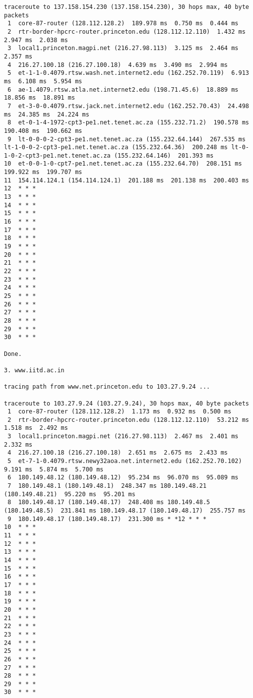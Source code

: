 \documentclass[a4paper]{article}
\begin{document}
\begin{enumerate}
\begin{lstlisting}
traceroute to 137.158.154.230 (137.158.154.230), 30 hops max, 40 byte packets
 1  core-87-router (128.112.128.2)  189.978 ms  0.750 ms  0.444 ms
 2  rtr-border-hpcrc-router.princeton.edu (128.112.12.110)  1.432 ms  2.947 ms  2.038 ms
 3  local1.princeton.magpi.net (216.27.98.113)  3.125 ms  2.464 ms  2.357 ms
 4  216.27.100.18 (216.27.100.18)  4.639 ms  3.490 ms  2.994 ms
 5  et-1-1-0.4079.rtsw.wash.net.internet2.edu (162.252.70.119)  6.913 ms  6.108 ms  5.954 ms
 6  ae-1.4079.rtsw.atla.net.internet2.edu (198.71.45.6)  18.889 ms  18.856 ms  18.891 ms
 7  et-3-0-0.4079.rtsw.jack.net.internet2.edu (162.252.70.43)  24.498 ms  24.385 ms  24.224 ms
 8  et-0-1-4-1972-cpt3-pe1.net.tenet.ac.za (155.232.71.2)  190.578 ms  190.408 ms  190.662 ms
 9  lt-0-0-0-2-cpt3-pe1.net.tenet.ac.za (155.232.64.144)  267.535 ms lt-1-0-0-2-cpt3-pe1.net.tenet.ac.za (155.232.64.36)  200.248 ms lt-0-1-0-2-cpt3-pe1.net.tenet.ac.za (155.232.64.146)  201.393 ms
10  et-0-0-1-0-cpt7-pe1.net.tenet.ac.za (155.232.64.70)  208.151 ms  199.922 ms  199.707 ms
11  154.114.124.1 (154.114.124.1)  201.188 ms  201.138 ms  200.403 ms
12  * * *
13  * * *
14  * * *
15  * * *
16  * * *
17  * * *
18  * * *
19  * * *
20  * * *
21  * * *
22  * * *
23  * * *
24  * * *
25  * * *
26  * * *
27  * * *
28  * * *
29  * * *
30  * * *

Done.

3. www.iitd.ac.in

tracing path from www.net.princeton.edu to 103.27.9.24 ...

traceroute to 103.27.9.24 (103.27.9.24), 30 hops max, 40 byte packets
 1  core-87-router (128.112.128.2)  1.173 ms  0.932 ms  0.500 ms
 2  rtr-border-hpcrc-router.princeton.edu (128.112.12.110)  53.212 ms  1.518 ms  2.492 ms
 3  local1.princeton.magpi.net (216.27.98.113)  2.467 ms  2.401 ms  2.332 ms
 4  216.27.100.18 (216.27.100.18)  2.651 ms  2.675 ms  2.433 ms
 5  et-7-1-0.4079.rtsw.newy32aoa.net.internet2.edu (162.252.70.102)  9.191 ms  5.874 ms  5.700 ms
 6  180.149.48.12 (180.149.48.12)  95.234 ms  96.070 ms  95.089 ms
 7  180.149.48.1 (180.149.48.1)  248.347 ms 180.149.48.21 (180.149.48.21)  95.220 ms  95.201 ms
 8  180.149.48.17 (180.149.48.17)  248.408 ms 180.149.48.5 (180.149.48.5)  231.841 ms 180.149.48.17 (180.149.48.17)  255.757 ms
 9  180.149.48.17 (180.149.48.17)  231.300 ms * *12 * * *
10  * * *
11  * * *
12  * * *
13  * * *
14  * * *
15  * * *
16  * * *
17  * * *
18  * * *
19  * * *
20  * * *
21  * * *
22  * * *
23  * * *
24  * * *
25  * * *
26  * * *
27  * * *
28  * * *
29  * * *
30  * * *


\end{lstlisting}
\end{enumerate}
\end{document}
